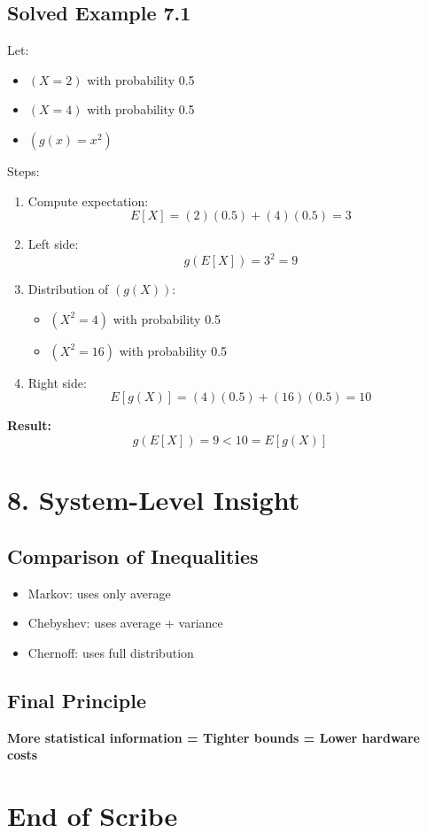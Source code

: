 \documentclass[11pt]{article}
\begin{document}
\subsection*{Solved Example 7.1}

Let:

\begin{itemize}
\item $( X = 2 )$ with probability 0.5
\item $( X = 4 )$ with probability 0.5
\item $( g(x) = x^2 )$
\end{itemize}

Steps:

\begin{enumerate}
\item Compute expectation:
\[
E[X] = (2)(0.5) + (4)(0.5) = 3
\]
\item Left side:
\[
g(E[X]) = 3^2 = 9
\]
\item Distribution of $( g(X) )$:
\begin{itemize}
\item $( X^2 = 4 )$ with probability 0.5
\item $( X^2 = 16 )$ with probability 0.5
\end{itemize}
\item Right side:
\[
E[g(X)] = (4)(0.5) + (16)(0.5) = 10
\]
\end{enumerate}

\textbf{Result:}
\[
g(E[X]) = 9 < 10 = E[g(X)]
\]

\section*{8. System-Level Insight}

\subsection*{Comparison of Inequalities}

\begin{itemize}
\item Markov: uses only average
\item Chebyshev: uses average + variance
\item Chernoff: uses full distribution
\end{itemize}

\subsection*{Final Principle}

\textbf{More statistical information = Tighter bounds = Lower hardware costs}

\section*{End of Scribe}
\end{document}
